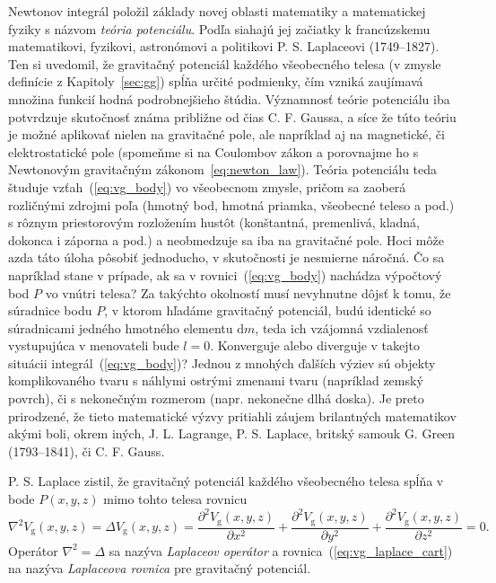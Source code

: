 \documentclass[a4paper, 12pt]{book}
\newcommand{\diff}{\mathrm d}
\newcommand{\gidx}{\mathrm g}
\begin{document}
Newtonov integrál položil základy novej oblasti matematiky a matematickej 
fyziky s názvom \emph{teória potenciálu}.  Podľa \cite{MacMillan1930} siahajú 
jej začiatky k francúzskemu matematikovi, fyzikovi, astronómovi a politikovi 
P. S. Laplaceovi (1749--1827).  Ten si uvedomil, že gravitačný potenciál 
každého všeobecného telesa (v zmysle definície z Kapitoly~\ref{sec:gg}) spĺňa 
určité podmienky, čím vzniká zaujímavá množina funkcií hodná podrobnejšieho 
štúdia.  Významnosť teórie potenciálu iba potvrdzuje skutočnosť známa približne 
od čias C. F. Gaussa, a síce že túto teóriu je možné aplikovať nielen na 
gravitačné pole, ale  napríklad aj na magnetické, či elektrostatické pole 
(spomeňme si na Coulombov zákon a porovnajme ho s Newtonovým gravitačným 
zákonom~\ref{eq:newton_law}).  Teória potenciálu teda študuje 
vzťah~(\ref{eq:vg_body}) vo všeobecnom zmysle, pričom sa zaoberá rozličnými 
zdrojmi poľa (hmotný bod, hmotná priamka, všeobecné teleso a pod.) s rôznym 
priestorovým rozložením hustôt (konštantná, premenlivá, kladná, dokonca 
i záporna a pod.) a neobmedzuje sa iba na gravitačné pole.  Hoci môže azda táto 
úloha pôsobiť jednoducho, v skutočnosti je nesmierne náročná.  Čo sa napríklad 
stane v prípade, ak sa v rovnici~(\ref{eq:vg_body}) nachádza výpočtový bod $P$ 
vo vnútri telesa?  Za takýchto okolností musí nevyhnutne dôjsť k tomu, že 
súradnice bodu $P$, v ktorom hľadáme gravitačný potenciál, budú identické so 
súradnicami jedného hmotného elementu $\diff m$, teda ich vzájomná vzdialenosť 
vystupujúca v menovateli bude $l = 0$.  Konverguje alebo diverguje v takejto 
situácii integrál~(\ref{eq:vg_body})?  Jednou z mnohých ďalších výziev sú 
objekty komplikovaného tvaru s náhlymi ostrými zmenami tvaru (napríklad zemský 
povrch), či s nekonečným rozmerom (napr. nekonečne dlhá doska).  Je preto 
prirodzené, že tieto matematické výzvy pritiahli záujem brilantných matematikov 
akými boli, okrem iných, J. L. Lagrange, P. S. Laplace, britský samouk G. Green 
(1793--1841), či C. F. Gauss.

P. S. Laplace zistil, že gravitačný potenciál každého všeobecného telesa spĺňa 
v bode $P(x, y, z)$ mimo tohto telesa rovnicu
%
\begin{equation}
\label{eq:vg_laplace_cart}
\nabla^2 V_\gidx(x, y, z) = \Delta V_\gidx(x, y, z) = \frac{\partial^2 
V_\gidx(x, y, z)}{\partial x^2}
+ \frac{\partial^2 V_\gidx(x, y, z)}{\partial y^2}
+ \frac{\partial^2 V_\gidx(x, y, z)}{\partial z^2} = 0{.}
\end{equation}
%
Operátor $\nabla^2 = \Delta$ sa nazýva \emph{Laplaceov operátor} 
a rovnica~(\ref{eq:vg_laplace_cart}) na nazýva \emph{Laplaceova rovnica} pre 
gravitačný potenciál.
\end{document}
